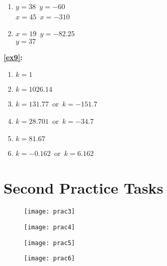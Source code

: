 \documentclass[a4paper,11pt]{article}
\begin{document}
\begin{multicols}{3}
\begin{enumerate}
\item $y=38$~$y=-60$\\$x=45$~$x=-310$
\item $x=19$~$y=-82.25$\\$y=37$
\end{enumerate}
\textbf{\ref{ex9}:}
\begin{enumerate}
\item $k=1$
\item $k=1026.14$
\item $k=131.77$~or~$k=-151.7$
\item $k=28.701$~or~$k=-34.7$
\item $k=81.67$
\item $k=-0.162$~or~$k=6.162$
\end{enumerate}
\end{multicols}


\newpage
\section{Second Practice Tasks}
\begin{figure}[!ht]
	\centering
	\texttt{[image: prac3]}
\end{figure}
\newpage
\begin{figure}[!ht]
	\centering
	\texttt{[image: prac4]}
\end{figure}
\newpage
\begin{figure}[!ht]
	\centering
	\texttt{[image: prac5]}
\end{figure}
\newpage
\begin{figure}[!ht]
	\centering
	\texttt{[image: prac6]}
\end{figure}
\newpage
\end{document}
